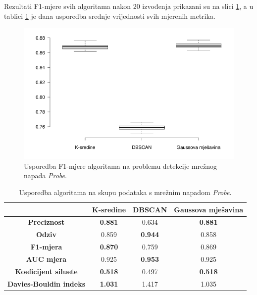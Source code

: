 \documentclass[utf8, diplomski, numeric]{fer}
\begin{document}
Rezultati F1-mjere svih algoritama nakon 20 izvođenja prikazani su na slici \ref{fig:probe-f1}, a u tablici \ref{tab:probe} je dana usporedba srednje vrijednosti svih mjerenih metrika. 

\begin{figure}[h!]
\includegraphics[width=1\textwidth]{images/probe-f1.png}
\centering
\caption{Usporedba F1-mjere algoritama na problemu detekcije mrežnog napada \textit{Probe}.}
\label{fig:probe-f1}
\end{figure}

\begin{table}[h!]
  \begin{center}
    \caption{Usporedba algoritama na skupu podataka s mrežnim napadom \textit{Probe}.}
    \label{tab:probe}
    \begin{tabular}{c|c|c|c} 
      & \textbf{K-sredine} & \textbf{DBSCAN}  & \textbf{Gaussova mješavina}\\
      \hline
      \textbf{Preciznost} & \textbf{0.881} & 0.634 & \textbf{0.881} \\
      \textbf{Odziv} & 0.859 & \textbf{0.944} & 0.858 \\
      \textbf{F1-mjera} & \textbf{0.870} & 0.759 & 0.869 \\
      \textbf{AUC mjera} & 0.925 & \textbf{0.953} & 0.925 \\
       \textbf{Koeficijent siluete} & \textbf{0.518} & 0.497 & \textbf{0.518} \\
       \textbf{Davies-Bouldin indeks} & \textbf{1.031} & 1.417 & 1.035 \\
     \end{tabular}
  \end{center}
\end{table}
\end{document}
